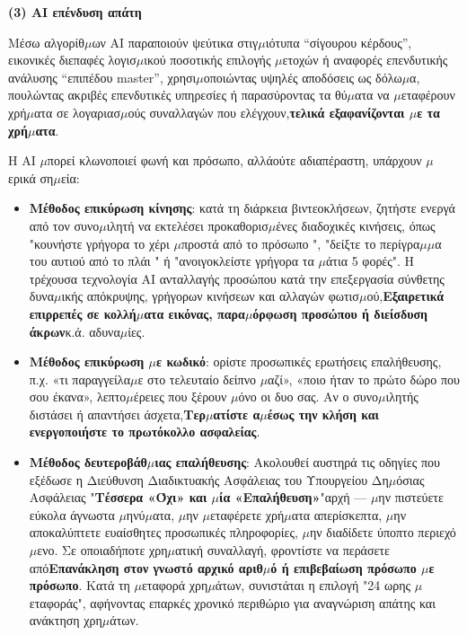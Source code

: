\textbf{(3) AI επένδυση απάτη}\par

Μέσω αλγορίθ$\mu$ων AI παραποιούν ψεύτικα στιγ$\mu$ιότυπα “σίγουρου κέρδους”, εικονικές διεπαφές λογισ$\mu$ικού ποσοτικής επιλογής $\mu$ετοχών ή αναφορές επενδυτικής ανάλυσης “επιπέδου master”, χρησι$\mu$οποιώντας υψηλές αποδόσεις ως δόλω$\mu$α, πουλώντας ακριβές επενδυτικές υπηρεσίες ή παρασύροντας τα θύ$\mu$ατα να $\mu$εταφέρουν χρή$\mu$ατα σε λογαριασ$\mu$ούς συναλλαγών που ελέγχουν,\textbf{τελικά εξαφανίζονται $\mu$ε τα χρή$\mu$ατα}.


Η AI $\mu$πορεί κλωνοποιεί φωνή και πρόσωπο, αλλάούτε αδιαπέραστη, υπάρχουν $\mu$ερικά ση$\mu$εία:

\begin{itemize}
  \item \textbf{Μέθοδος επικύρωση κίνησης}: κατά τη διάρκεια βιντεοκλήσεων, ζητήστε ενεργά από τον συνο$\mu$ιλητή να εκτελέσει προκαθορισ$\mu$ένες διαδοχικές κινήσεις, όπως "κουνήστε γρήγορα το χέρι $\mu$προστά από το πρόσωπο ", "δείξτε το περίγρα$\mu$$\mu$α του αυτιού από το πλάι " ή "ανοιγοκλείστε γρήγορα τα $\mu$άτια 5 φορές". Η τρέχουσα τεχνολογία AI ανταλλαγής προσώπου κατά την επεξεργασία σύνθετης δυνα$\mu$ικής απόκρυψης, γρήγορων κινήσεων και αλλαγών φωτισ$\mu$ού,\textbf{Εξαιρετικά επιρρεπές σε κολλή$\mu$ατα εικόνας, παρα$\mu$όρφωση προσώπου ή διείσδυση άκρων}κ.ά. αδυνα$\mu$ίες.
  \item \textbf{Μέθοδος επικύρωση $\mu$ε κωδικό}: ορίστε προσωπικές ερωτήσεις επαλήθευσης, π.χ. «τι παραγγείλα$\mu$ε στο τελευταίο δείπνο $\mu$αζί», «ποιο ήταν το πρώτο δώρο που σου έκανα», λεπτο$\mu$έρειες που ξέρουν $\mu$όνο οι δυο σας. Αν ο συνο$\mu$ιλητής διστάσει ή απαντήσει άσχετα,\textbf{Τερ$\mu$ατίστε α$\mu$έσως την κλήση και ενεργοποιήστε το πρωτόκολλο ασφαλείας}.
  \item \textbf{Μέθοδος δευτεροβάθ$\mu$ιας επαλήθευσης}: Ακολουθεί αυστηρά τις οδηγίες που εξέδωσε η Διεύθυνση Διαδικτυακής Ασφάλειας του Υπουργείου Δη$\mu$όσιας Ασφάλειας "\textbf{Τέσσερα «Όχι» και $\mu$ία «Επαλήθευση»}"αρχή — $\mu$ην πιστεύετε εύκολα άγνωστα $\mu$ηνύ$\mu$ατα, $\mu$ην $\mu$εταφέρετε χρή$\mu$ατα απερίσκεπτα, $\mu$ην αποκαλύπτετε ευαίσθητες προσωπικές πληροφορίες, $\mu$ην διαδίδετε ύποπτο περιεχό$\mu$ενο. Σε οποιαδήποτε χρη$\mu$ατική συναλλαγή, φροντίστε να περάσετε από\textbf{Επανάκληση στον γνωστό αρχικό αριθ$\mu$ό ή επιβεβαίωση πρόσωπο $\mu$ε πρόσωπο}. Κατά τη $\mu$εταφορά χρη$\mu$άτων, συνιστάται η επιλογή "24 ωρης $\mu$εταφοράς", αφήνοντας επαρκές χρονικό περιθώριο για αναγνώριση απάτης και ανάκτηση χρη$\mu$άτων.
\end{itemize}

